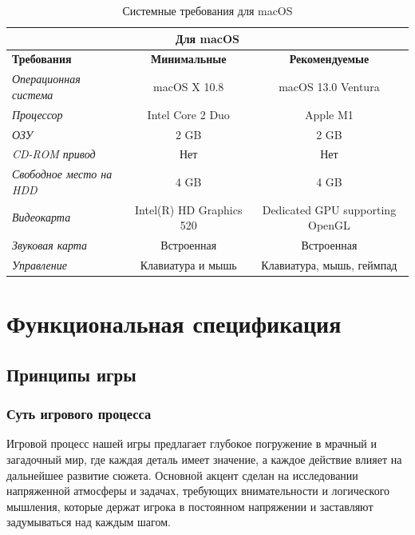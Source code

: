 \documentclass{article}
\begin{document}
	\begin{table}[h!]
		\centering
		\renewcommand{\arraystretch}{1.5}
		\setlength{\tabcolsep}{8pt}
		\begin{tabular}{|l|c|c|}
			\hline
			\multicolumn{3}{|c|}{\textbf{Для macOS}} \\ \hline
			\textbf{Требования} & \textbf{Минимальные} & \textbf{Рекомендуемые} \\ \hline
			\textit{Операционная система} & macOS X 10.8 & macOS 13.0 Ventura \\ \hline
			\textit{Процессор} &  Intel Core 2 Duo & Apple M1 \\ \hline
			\textit{ОЗУ} & 2 GB & 2 GB \\ \hline
			\textit{CD-ROM привод} & Нет & Нет \\ \hline
			\textit{Свободное место на HDD} & 4 GB & 4 GB \\ \hline
			\textit{Видеокарта} & Intel(R) HD Graphics 520 & Dedicated GPU supporting OpenGL \\ \hline
			\textit{Звуковая карта} & Встроенная & Встроенная \\ \hline
			\textit{Управление} & Клавиатура и мышь & Клавиатура, мышь, геймпад \\ \hline
		\end{tabular}
		\caption{Системные требования для macOS}
		\label{tab:system-requirements2}
	\end{table}
	
	\newpage
	\section{Функциональная спецификация}
	
	\subsection{Принципы игры}
	
	\subsubsection{Суть игрового процесса}
	 
	 Игровой процесс нашей игры предлагает глубокое погружение в мрачный и загадочный мир, где каждая деталь имеет значение, а каждое действие влияет на дальнейшее развитие сюжета. Основной акцент сделан на исследовании напряженной атмосферы и задачах, требующих внимательности и логического мышления, которые держат игрока в постоянном напряжении и заставляют задумываться над каждым шагом. \\
	 
\end{document}
